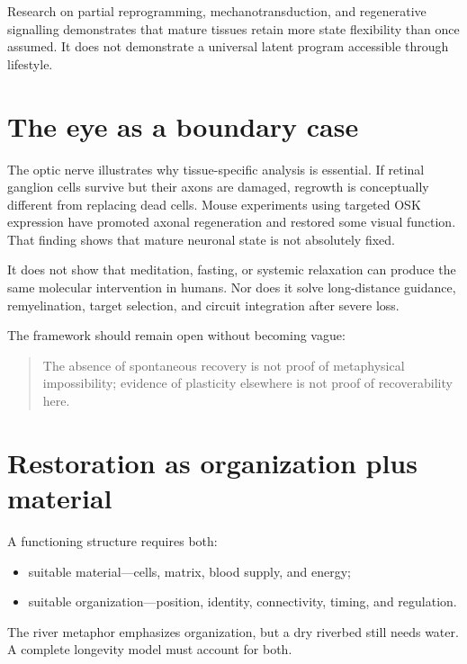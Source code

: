 Research on partial reprogramming, mechanotransduction, and regenerative signalling demonstrates that mature tissues retain more state flexibility than once assumed. It does not demonstrate a universal latent program accessible through lifestyle.

\section{The eye as a boundary case}

The optic nerve illustrates why tissue-specific analysis is essential. If retinal ganglion cells survive but their axons are damaged, regrowth is conceptually different from replacing dead cells. Mouse experiments using targeted OSK expression have promoted axonal regeneration and restored some visual function. That finding shows that mature neuronal state is not absolutely fixed.

It does not show that meditation, fasting, or systemic relaxation can produce the same molecular intervention in humans. Nor does it solve long-distance guidance, remyelination, target selection, and circuit integration after severe loss.

The framework should remain open without becoming vague:

\begin{quote}
The absence of spontaneous recovery is not proof of metaphysical impossibility; evidence of plasticity elsewhere is not proof of recoverability here.
\end{quote}

\section{Restoration as organization plus material}

A functioning structure requires both:

\begin{itemize}
\tightlist
\item
  suitable material---cells, matrix, blood supply, and energy;
\item
  suitable organization---position, identity, connectivity, timing, and regulation.
\end{itemize}

The river metaphor emphasizes organization, but a dry riverbed still needs water. A complete longevity model must account for both.
